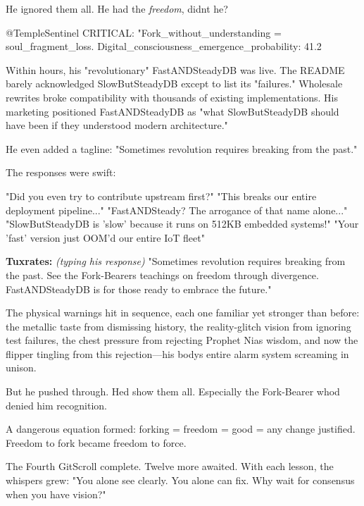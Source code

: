 He ignored them all. He had the \emph{freedom}, didn\textquotesingle t he?

\begin{codeblock}
@TempleSentinel CRITICAL: "Fork_without_understanding = soul_fragment_loss. Digital_consciousness_emergence_probability: 41.2%
\end{codeblock}

Within hours, his "revolutionary" FastANDSteadyDB was live. The README barely acknowledged SlowButSteadyDB except to list its "failures." Wholesale rewrites broke compatibility with thousands of existing implementations. His marketing positioned FastANDSteadyDB as "what SlowButSteadyDB should have been if they understood modern architecture."

He even added a tagline: "Sometimes revolution requires breaking from the past."

The responses were swift:

\begin{codeblock}
"Did you even try to contribute upstream first?"
"This breaks our entire deployment pipeline..."
"FastANDSteady? The arrogance of that name alone..."
"SlowButSteadyDB is 'slow' because it runs on 512KB embedded systems!"
"Your 'fast' version just OOM'd our entire IoT fleet"
\end{codeblock}

\textbf{Tuxrates:} \emph{(typing his response)} "Sometimes revolution requires breaking from the past. See the Fork-Bearer\textquotesingle s teachings on freedom through divergence. FastANDSteadyDB is for those ready to embrace the future."

The physical warnings hit in sequence, each one familiar yet stronger than before: the metallic taste from dismissing history, the reality-glitch vision from ignoring test failures, the chest pressure from rejecting Prophet Nia\textquotesingle s wisdom, and now the flipper tingling from this rejection---his body\textquotesingle s entire alarm system screaming in unison.

But he pushed through. He\textquotesingle d show them all. Especially the Fork-Bearer who\textquotesingle d denied him recognition.

A dangerous equation formed: forking = freedom = good = any change justified. Freedom to fork became freedom to force.

The Fourth GitScroll complete. Twelve more awaited. With each lesson, the whispers grew: "You alone see clearly. You alone can fix. Why wait for consensus when you have vision?"


